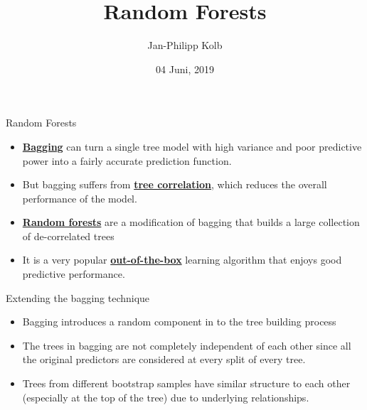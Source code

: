 \documentclass[
  10pt,
  ignorenonframetext,
]{beamer}
\title{Random Forests}
\author{Jan-Philipp Kolb}
\date{04 Juni, 2019}
\providecommand{\tightlist}{%
  \setlength{\itemsep}{0pt}\setlength{\parskip}{0pt}}
\begin{document}
\frame{\titlepage}

\begin{frame}{Random Forests}
\protect\hypertarget{random-forests}{}

\begin{itemize}
\tightlist
\item
  \href{https://en.wikipedia.org/wiki/Bootstrap_aggregating}{\textbf{Bagging}}
  can turn a single tree model with high variance and poor predictive
  power into a fairly accurate prediction function.
\item
  But bagging suffers from
  \href{https://stats.stackexchange.com/questions/295868/why-is-tree-correlation-a-problem-when-working-with-bagging}{\textbf{tree
  correlation}}, which reduces the overall performance of the model.
\item
  \href{https://en.wikipedia.org/wiki/Random_forest}{\textbf{Random
  forests}} are a modification of bagging that builds a large collection
  of de-correlated trees
\item
  It is a very popular
  \href{https://en.wikipedia.org/wiki/Out_of_the_box_(feature)}{\textbf{out-of-the-box}}
  learning algorithm that enjoys good predictive performance.
\end{itemize}

\end{frame}

\begin{frame}{Extending the bagging technique}
\protect\hypertarget{extending-the-bagging-technique}{}

\begin{itemize}
\tightlist
\item
  Bagging introduces a random component in to the tree building process 
\item
  The trees in bagging are not completely independent of each other
  since all the original predictors are considered at every split of
  every tree.
\item
  Trees from different bootstrap samples have similar structure to each
  other (especially at the top of the tree) due to underlying
  relationships.
\end{itemize}

\end{frame}
\end{document}
